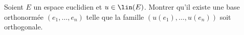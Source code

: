 \begin{enonce}
\begin{exercise}[ID={RMS135 E901},subtitle={Mines-Ponts PSI 2024},tags={oraux},difficulty={}]
  Soient $E$ un espace euclidien et $u\in\lin(E)$.
  Montrer qu'il existe une base orthonormée $(e_1,\dots,e_n)$ telle que la famille $\left( u(e_1),\dots, u(e_n) \right)$ soit orthogonale.
\end{exercise}
\begin{solution}
\end{solution}
\end{enonce}
